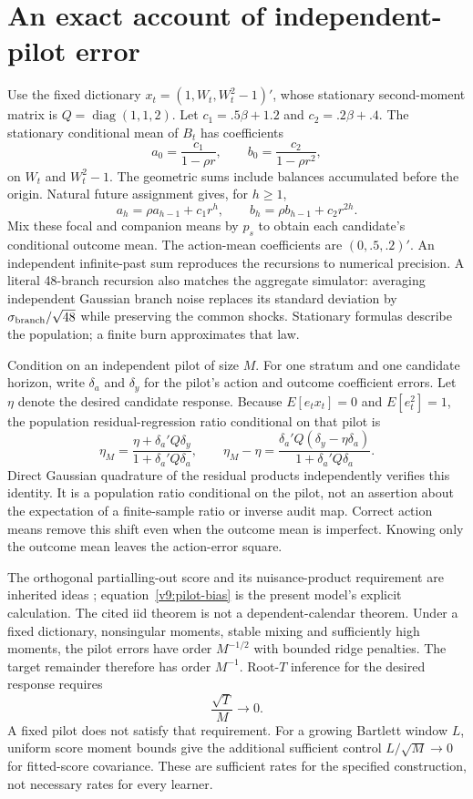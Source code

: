 \section{An exact account of independent-pilot error}
\label{v9:pilot}

Use the fixed dictionary $x_t=(1,W_t,W_t^2-1)'$, whose stationary second-moment
matrix is $Q=\operatorname{diag}(1,1,2)$. Let
$c_1=.5\beta+1.2$ and $c_2=.2\beta+.4$. The stationary conditional mean of
$B_t$ has coefficients
\[
 a_0=\frac{c_1}{1-\rho r},\qquad
 b_0=\frac{c_2}{1-\rho r^2},
\]
on $W_t$ and $W_t^2-1$. The geometric sums include balances accumulated before
the origin. Natural future assignment gives, for $h\geq1$,
\[
 a_h=\rho a_{h-1}+c_1r^h,\qquad
 b_h=\rho b_{h-1}+c_2r^{2h}.
\]
Mix these focal and companion means by $p_s$ to obtain each candidate's
conditional outcome mean. The action-mean coefficients are $(0,.5,.2)'$.
An independent infinite-past sum reproduces the recursions to numerical
precision. A literal 48-branch recursion also matches the aggregate simulator:
averaging independent Gaussian branch noise replaces its standard deviation
by $\sigma_{\rm branch}/\sqrt{48}$ while preserving the common shocks.
Stationary formulas describe the population; a finite burn approximates that law.

Condition on an independent pilot of size $M$. For one stratum and one
candidate horizon, write $\delta_a$ and $\delta_y$ for the pilot's action and
outcome coefficient errors. Let $\eta$ denote the desired candidate response.
Because $E[e_tx_t]=0$ and $E[e_t^2]=1$, the population residual-regression ratio
conditional on that pilot is
\begin{equation}
 \eta_M=\frac{\eta+\delta_a'Q\delta_y}
                    {1+\delta_a'Q\delta_a},\qquad
 \eta_M-\eta=
 \frac{\delta_a'Q(\delta_y-\eta\delta_a)}
      {1+\delta_a'Q\delta_a}. \label{v9:pilot-bias}
\end{equation}
Direct Gaussian quadrature of the residual products independently verifies
this identity. It is a population ratio conditional on the pilot, not an
assertion about the expectation of a finite-sample ratio or inverse audit map.
Correct action means remove this shift even when the outcome mean is
imperfect. Knowing only the outcome mean leaves the action-error square.

The orthogonal partialling-out score and its nuisance-product requirement are
inherited ideas \citep[Section 4.1, equation (4.4), Assumption 4.1]{dml2018};
equation~\eqref{v9:pilot-bias} is the present model's explicit calculation.
The cited iid theorem is not a dependent-calendar theorem. Under a fixed
dictionary, nonsingular moments, stable mixing and sufficiently high moments,
the pilot errors have order $M^{-1/2}$ with bounded ridge penalties. The target
remainder therefore has order $M^{-1}$. Root-$T$ inference for the desired
response requires
\[
 \frac{\sqrt T}{M}\longrightarrow0.
\]
A fixed pilot does not satisfy that requirement. For a growing Bartlett
window $L$, uniform score moment bounds give the additional sufficient control
$L/\sqrt M\to0$ for fitted-score covariance. These are sufficient rates for
the specified construction, not necessary rates for every learner.

